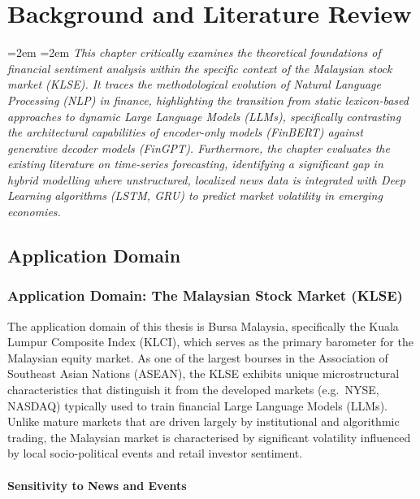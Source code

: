 \documentclass[singlespace]{ucetd}
\newcommand{\chapterabstract}[1]{%
  \par\vspace{1em}
  \begingroup
  \leftskip=2em
  \rightskip=2em
  \noindent\itshape
  #1
  \par
  \endgroup
  \vspace{1.5em}
}
\begin{document}




\chapter{Background and Literature Review}

\chapterabstract{This chapter critically examines the theoretical foundations of financial sentiment analysis within the specific context of the Malaysian stock market (KLSE). It traces the methodological evolution of Natural Language Processing (NLP) in finance, highlighting the transition from static lexicon-based approaches to dynamic Large Language Models (LLMs), specifically contrasting the architectural capabilities of encoder-only models (FinBERT) against generative decoder models (FinGPT). Furthermore, the chapter evaluates the existing literature on time-series forecasting, identifying a significant gap in hybrid modelling where unstructured, localized news data is integrated with Deep Learning algorithms (LSTM, GRU) to predict market volatility in emerging economies.}

\section{Application Domain}
\subsection{Application Domain: The Malaysian Stock Market (KLSE)}

The application domain of this thesis is Bursa Malaysia, specifically the Kuala Lumpur Composite Index (KLCI), which serves as the primary barometer for the Malaysian equity market. As one of the largest bourses in the Association of Southeast Asian Nations (ASEAN), the KLSE exhibits unique microstructural characteristics that distinguish it from the developed markets (e.g.\ NYSE, NASDAQ) typically used to train financial Large Language Models (LLMs). Unlike mature markets that are driven largely by institutional and algorithmic trading, the Malaysian market is characterised by significant volatility influenced by local socio-political events and retail investor sentiment.

\subsubsection{Sensitivity to News and Events}
\end{document}
